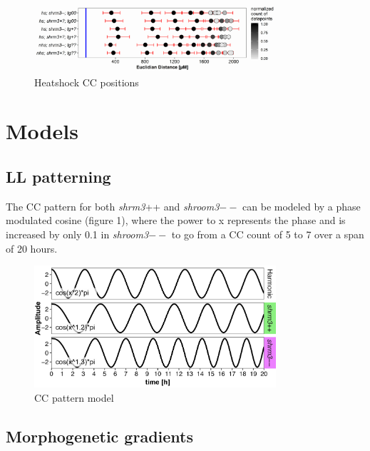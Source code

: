 \documentclass[11pt,singlespacinge,twoside]{reedthesis} %
\begin{document}
\begin{figure}

{\centering \includegraphics[width=0.8\textwidth]{figures/results/06_rescues/shrm3/cc_positions} 

}

\caption[Heatshock CC positions]{Heatshock CC positions}\label{fig:supphscc}
\end{figure}
\hypertarget{models}{%
\section{Models}\label{models}}

\hypertarget{ll-patterning}{%
\subsection{LL patterning}\label{ll-patterning}}

The CC pattern for both \emph{shrm3}++ and \emph{shroom3}\(--\) can be modeled by a phase modulated cosine (figure 1), where the power to x represents the phase and is increased by only 0.1 in \emph{shroom3}\(--\) to go from a CC count of 5 to 7 over a span of 20 hours.


\begin{figure}

{\centering \includegraphics[width=0.8\textwidth]{figures/supp/cc_model} 

}

\caption[CC pattern model]{CC pattern model}\label{fig:supccpmodel}
\end{figure}
\hypertarget{morphogenetic-gradients}{%
\subsection{Morphogenetic gradients}\label{morphogenetic-gradients}}
\end{document}
